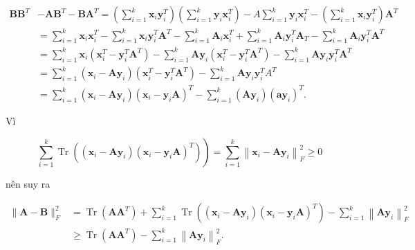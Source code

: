 \documentclass[12pt,a4paper,oneside]{report}
\numberwithin{equation}{section}
\begin{document}
$$
\begin{aligned}
	\mathbf{B} \mathbf{B}^{T} & -\mathbf{A B}^{T}-\mathbf{B} \mathbf{A}^{T}=\left(\sum_{i=1}^{k} \mathbf{x}_{i} \mathbf{y}_{i}^{T}\right)\left(\sum_{i=1}^{k} \mathbf{y}_{i} \mathbf{x}_{i}^{T}\right)-A \sum_{i=1}^{k} \mathbf{y}_{i} \mathbf{x}_{i}^{T}-\left(\sum_{i=1}^{k} \mathbf{x}_{i} \mathbf{y}_{i}^{T}\right) \mathbf{A}^{T} \\
	& =\sum_{i=1}^{k} \mathbf{x}_{i} \mathbf{x}_{i}^{T}-\sum_{i=1}^{k} \mathbf{x}_{i} \mathbf{y}_{i}^{T} \mathbf{A}^{T}-\sum_{i=1}^{k} \mathbf{A}_{i} \mathbf{x}_{i}^{T}+\sum_{i=1}^{k} \mathbf{A}_{i} \mathbf{y}_{i}^{T} \mathbf{A}_{T}-\sum_{i=1}^{k} \mathbf{A}_{i} \mathbf{y}_{i}^{T} \mathbf{A}^{T} \\
	& =\sum_{i=1}^{k} \mathbf{x}_{i}\left(\mathbf{x}_{i}^{T}-\mathbf{y}_{i}^{T} \mathbf{A}^{T}\right)-\sum_{i=1}^{k} \mathbf{A} \mathbf{y}_{i}\left(\mathbf{x}_{i}^{T}-\mathbf{y}_{i}^{T} \mathbf{A}^{T}\right)-\sum_{i=1}^{k} \mathbf{A} \mathbf{y}_{i} \mathbf{y}_{i}^{T} \mathbf{A}^{T} \\
	& =\sum_{i=1}^{k}\left(\mathbf{x}_{i}-\mathbf{A} \mathbf{y}_{i}\right)\left(\mathbf{x}_{i}^{T}-\mathbf{y}_{i}^{T} \mathbf{A}^{T}\right)-\sum_{i=1}^{k} \mathbf{A} \mathbf{y}_{i} \mathbf{y}_{i}^{T} A^{T} \\
	& =\sum_{i=1}^{k}\left(\mathbf{x}_{i}-\mathbf{A} \mathbf{y}_{i}\right)\left(\mathbf{x}_{i}-\mathbf{y}_{i} \mathbf{A}\right)^{T}-\sum_{i=1}^{k}\left(\mathbf{A y}_{i}\right)\left(\mathbf{a y}_{i}\right)^{T} .
\end{aligned}
$$

Vì

$$
\left.\sum_{i=1}^{k} \operatorname{Tr}\left(\left(\mathbf{x}_{i}-\mathbf{A y}_{i}\right)\left(\mathbf{x}_{i}-\mathbf{y}_{i} \mathbf{A}\right)^{T}\right)\right)=\sum_{i=1}^{k}\left\|\mathbf{x}_{i}-\mathbf{A y}_{i}\right\|_{F}^{2} \geqslant 0
$$

nên suy ra

$$
\begin{aligned}
	\|\mathbf{A}-\mathbf{B}\|_{F}^{2} & =\operatorname{Tr}\left(\mathbf{A} \mathbf{A}^{T}\right)+\sum_{i=1}^{k} \operatorname{Tr}\left(\left(\mathbf{x}_{i}-\mathbf{A} \mathbf{y}_{i}\right)\left(\mathbf{x}_{i}-\mathbf{y}_{i} \mathbf{A}\right)^{T}\right)-\sum_{i=1}^{k}\left\|\mathbf{A y}_{i}\right\|_{F}^{2} \\
	& \geqslant \operatorname{Tr}\left(\mathbf{A} \mathbf{A}^{T}\right)-\sum_{i=1}^{k}\left\|\mathbf{A y}_{i}\right\|_{F}^{2} .
\end{aligned}
$$
\end{document}
